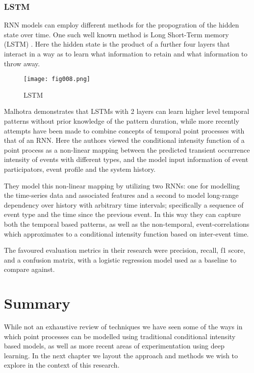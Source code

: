 \subsubsection{LSTM}
RNN models can employ different methods for the propogration of the hidden state over time. One such well known method is Long Short-Term memory (LSTM) \parencite{Olah}. Here the hidden state is the product of a further four layers that interact in a way as to learn what information to retain and what information to throw away. 

\begin{figure}[h!]
	\centering
	\texttt{[image: fig008.png]}
	\caption{LSTM}
	\label{fig:fig8}
\end{figure} 

Malhotra  \parencite{malhotra2015long} demonstrates that LSTMs with 2 layers can learn higher level temporal patterns without prior knowledge of the pattern duration, while more recently \parencite{xiao2017modeling} attempts have been made to combine concepts of temporal point processes with that of an RNN. Here the authors viewed the conditional intensity function of a point process as a non-linear mapping between the predicted transient occurrence intensity of events with different types, and the  model  input  information  of  event  participators, event
profile and the system history.

They model this non-linear mapping by utilizing two RNNs: one for modelling the time-series data and associated features and a second to model long-range dependency over history with arbitrary time intervals; specifically a sequence of event type and the time since the previous event. In this way they can capture both the temporal based patterns, as well as the non-temporal, event-correlations which approximates to a conditional intensity function based on inter-event time.

The favoured evaluation metrics in their research were precision, recall, f1 score, and a confusion matrix, with a logistic regression model used as a baseline to compare against.

\section{Summary}

While not an exhaustive review of techniques we have seen some of the ways in which point processes can be modelled using traditional conditional intensity based models, as well as more recent areas of experimentation using deep learning. In the next chapter we layout the approach and methods we wish to explore in the context of this research.